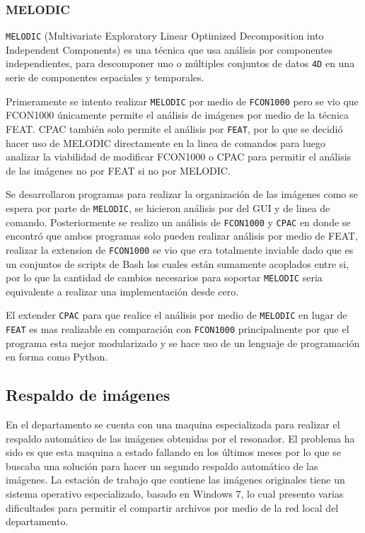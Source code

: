 \documentclass{article}
\begin{document}
\subsubsection{MELODIC}

\texttt{MELODIC} (Multivariate Exploratory Linear Optimized Decomposition into Independent Components) es una técnica que usa análisis por componentes independientes, para descomponer uno o múltiples conjuntos de datos \texttt{4D} en una serie de componentes espaciales y temporales.

Primeramente se intento realizar \texttt{MELODIC} por medio de \texttt{FCON1000} pero se vio que FCON1000 únicamente permite el análisis de imágenes por medio de la técnica FEAT. CPAC también solo permite el análisis por \texttt{FEAT}, por lo que se decidió hacer uso de MELODIC directamente en la linea de comandos para luego analizar la viabilidad de modificar FCON1000 o CPAC para permitir el análisis de las imágenes no por FEAT si no por MELODIC.

Se desarrollaron programas para realizar la organización de las imágenes como se espera por parte de \texttt{MELODIC}, se hicieron análisis por del GUI y de linea de comando. Posteriormente se realizo un análisis de \texttt{FCON1000} y \texttt{CPAC} en donde se encontró que ambos programas solo pueden realizar análisis por medio de FEAT, realizar la extension de \texttt{FCON1000} se vio que era totalmente inviable dado que es un conjuntos de scripts de Bash los cuales están sumamente acoplados entre si, por lo que la cantidad de cambios necesarios para soportar \texttt{MELODIC} seria equivalente a realizar una implementación desde cero.

El extender \texttt{CPAC} para que realice el análisis por medio de \texttt{MELODIC} en lugar de \texttt{FEAT} es mas realizable en comparación con \texttt{FCON1000} principalmente por que el programa
esta mejor modularizado y se hace uso de un lenguaje de programación en forma como Python.

\subsection{Respaldo de imágenes}

En el departamento se cuenta con una maquina especializada para realizar el respaldo automático de las imágenes obtenidas por el resonador. El problema ha sido es que esta maquina a estado fallando en los últimos meses por lo que se buscaba una solución para hacer un segundo respaldo automático de las imágenes.
La estación de trabajo que contiene las imágenes originales tiene un sistema operativo especializado, basado en Windows 7, lo cual presento varias dificultades para permitir el compartir archivos por medio de la red local del departamento. 
\end{document}
